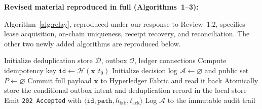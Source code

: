 \documentclass[11pt]{article}
\begin{document}
\medskip
\noindent\textbf{Revised material reproduced in full (Algorithms~1--3):}

Algorithm~\ref{alg:relay}, reproduced under our response to Review~1.2, specifies lease acquisition, on-chain uniqueness, receipt recovery, and reconciliation. The other two newly added algorithms are reproduced below.

\begin{algorithm}[!htbp]
\scriptsize
\color{blue}
\caption{Pseudocode for deterministic policy-driven routing and commit}
\label{alg:routing}
Initialize deduplication store $\mathcal{D}$, outbox $\mathcal{O}$, ledger connections\;
Compute idempotency key $\texttt{id} \leftarrow \mathcal{H}(\mathbf{x}\Vert t_0)$\;
Initialize decision log $\mathcal{A}\leftarrow\varnothing$ and public set $P\leftarrow\varnothing$\;
Commit full payload $\mathbf{x}$ to Hyperledger Fabric and read it back\;
Atomically store the conditional outbox intent and deduplication record in the local store\;
Emit \texttt{202 Accepted} with $\langle\texttt{id},\texttt{path},h_{\mathrm{fab}},t_{\mathrm{ack}}\rangle$\;
Log $\mathcal{A}$ to the immutable audit trail\;
\;
\end{algorithm}
\end{document}
